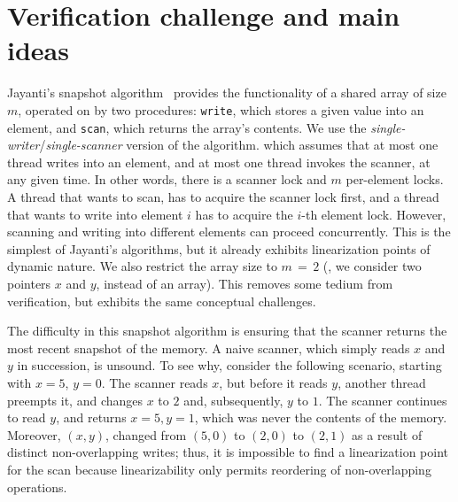 


\newcommand{\fx}{\mathit{fx}}
\newcommand{\fy}{\mathit{fy}}
\newcommand{\x}{x}
\newcommand{\y}{y}
\newcommand{\s}{S}



\newcommand{\jywrite}{\texttt{write}\xspace}
\newcommand{\jyscan}{\texttt{scan}\xspace}

\section{Verification challenge and main ideas}
\label{sc:overview}


Jayanti's snapshot algorithm~\cite{Jayanti+STOC05} provides the
functionality of a shared array of size $m$, operated on by two
procedures: \jywrite, which stores a given value into an element, and
\jyscan, which returns the array's contents. We use the
\emph{single-writer}/\emph{single-scanner} version of the algorithm.
which assumes that at most one thread writes into an element, and at
most one thread invokes the scanner, at any given time. In other
words, there is a scanner lock and $m$ per-element locks. A thread
that wants to scan, has to acquire the scanner lock first, and a
thread that wants to write into element $i$ has to acquire the $i$-th
element lock. However, scanning and writing into different elements
can proceed concurrently.
% 
This is the simplest of Jayanti's algorithms, but it already exhibits
linearization points of dynamic nature. We also restrict the array
size to $m\,{=}\,2$ (\ie, we consider two pointers $\x$ and $\y$,
instead of an array). This removes some tedium from verification, but
exhibits the same conceptual challenges.
 
The difficulty in this snapshot algorithm is ensuring that the scanner
returns the most recent snapshot of the memory. A naive scanner, which
simply reads $\x$ and $\y$ in succession, is unsound. To see why,
consider the following scenario, starting with $\x=5$, $\y=0$. The
scanner reads $\x$, but before it reads $\y$, another thread preempts
it, and changes $\x$ to $2$ and, subsequently, $\y$ to $1$. The
scanner continues to read $\y$, and returns $\x=5, \y=1$, which was
never the contents of the memory. Moreover, $(\x, \y)$, changed from
$(5,0)$ to $(2, 0)$ to $(2, 1)$ as a result of distinct
non-overlapping writes; thus, it is impossible to find a linearization
point for the scan because linearizability only permits reordering of
non-overlapping operations.

